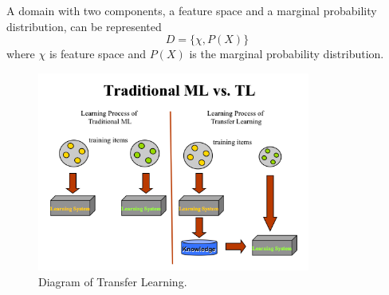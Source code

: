 A domain with two components, a feature space and a marginal probability distribution, can be represented
\begin{equation}\label{eq:TransLearning}
D = \{ \chi, P(X) \}
\end{equation}
where $\chi$ is feature space and $P(X)$ is the marginal probability distribution. 
\graphicspath{ {./Figures/} }
\begin{figure}[!htb]
\centering
\includegraphics[width=0.8\textwidth]{MLvsTL.png}
\caption{\label{fig:perceptron}Diagram of Transfer Learning.}
\end{figure}
